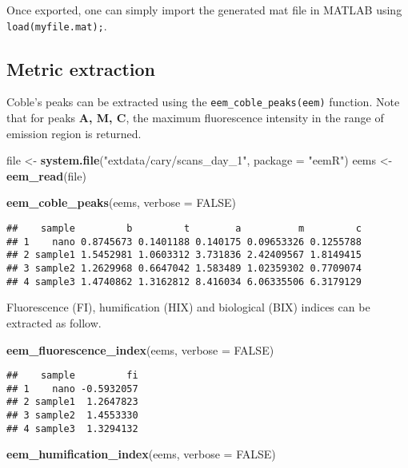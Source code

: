 \documentclass[]{book}
\newenvironment{Shaded}{\begin{snugshade}}{\end{snugshade}}
\newcommand{\KeywordTok}[1]{\textcolor[rgb]{0.13,0.29,0.53}{\textbf{{#1}}}}
\newcommand{\DataTypeTok}[1]{\textcolor[rgb]{0.13,0.29,0.53}{{#1}}}
\newcommand{\StringTok}[1]{\textcolor[rgb]{0.31,0.60,0.02}{{#1}}}
\newcommand{\OtherTok}[1]{\textcolor[rgb]{0.56,0.35,0.01}{{#1}}}
\newcommand{\NormalTok}[1]{{#1}}
\begin{document}
Once exported, one can simply import the generated mat file in MATLAB
using \texttt{load(\textquotesingle{}myfile.mat\textquotesingle{});}.

\subsection{Metric extraction}\label{metric-extraction}

Coble's peaks can be extracted using the \texttt{eem\_coble\_peaks(eem)}
function. Note that for peaks \textbf{A, M, C}, the maximum fluorescence
intensity in the range of emission region is returned.

\begin{Shaded}
\begin{Highlighting}[]
\NormalTok{file <-}\StringTok{ }\KeywordTok{system.file}\NormalTok{(}\StringTok{"extdata/cary/scans_day_1"}\NormalTok{, }\DataTypeTok{package =} \StringTok{"eemR"}\NormalTok{)}
\NormalTok{eems <-}\StringTok{ }\KeywordTok{eem_read}\NormalTok{(file)}

\KeywordTok{eem_coble_peaks}\NormalTok{(eems, }\DataTypeTok{verbose =} \OtherTok{FALSE}\NormalTok{)}
\end{Highlighting}
\end{Shaded}

\begin{verbatim}
##    sample         b         t        a          m         c
## 1    nano 0.8745673 0.1401188 0.140175 0.09653326 0.1255788
## 2 sample1 1.5452981 1.0603312 3.731836 2.42409567 1.8149415
## 3 sample2 1.2629968 0.6647042 1.583489 1.02359302 0.7709074
## 4 sample3 1.4740862 1.3162812 8.416034 6.06335506 6.3179129
\end{verbatim}

Fluorescence (FI), humification (HIX) and biological (BIX) indices can
be extracted as follow.

\begin{Shaded}
\begin{Highlighting}[]
\KeywordTok{eem_fluorescence_index}\NormalTok{(eems, }\DataTypeTok{verbose =} \OtherTok{FALSE}\NormalTok{)}
\end{Highlighting}
\end{Shaded}

\begin{verbatim}
##    sample         fi
## 1    nano -0.5932057
## 2 sample1  1.2647823
## 3 sample2  1.4553330
## 4 sample3  1.3294132
\end{verbatim}

\begin{Shaded}
\begin{Highlighting}[]
\KeywordTok{eem_humification_index}\NormalTok{(eems, }\DataTypeTok{verbose =} \OtherTok{FALSE}\NormalTok{)}
\end{Highlighting}
\end{Shaded}
\end{document}
